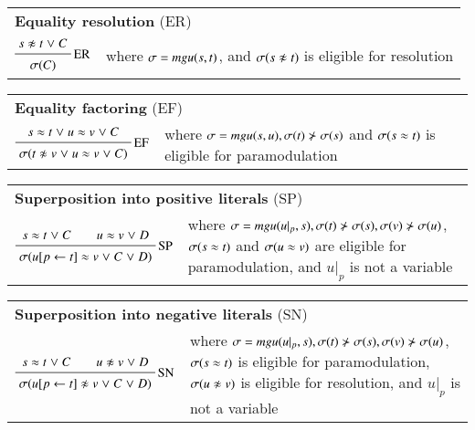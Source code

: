 \medskip
\begin{tabular}{m{}m{}}
    \multicolumn{2}{l}{{\bf Equality resolution} (ER)} \\[\jot]
    $\namedinference{ER}{s \noteq t \llor C}{\sigmacl{C}}$ & where $\sigma = \mathit{mgu}(s,t)$, and $\sigmacl{s \noteq t}$ is eligible for resolution
\end{tabular}

\medskip

\begin{tabular}{m{}m{}}
    \multicolumn{2}{l}{{\bf Equality factoring} (EF)} \\[\jot]
    $\namedinference{EF}{s \eq t \llor u \eq v \llor C}{\sigmacl{t \noteq v \llor u \eq v \llor C}}$ 
        & where $\sigma = \mathit{mgu}(s,u), \sigma(t) \not\succ \sigma(s)$ and 
        $\sigma(s \approx t)$ is eligible for paramodulation
\end{tabular}

\medskip

\begin{tabular}{m{}m{}}
    \multicolumn{2}{l}{{\bf Superposition into positive literals} (SP)} \\[\jot]
    $\namedinference{SP}{s \eq t \llor C \qquad u \eq v \llor D}{\sigmacl{u[p \leftarrow t] \eq v \llor C \llor D}}$ 
        & where $\sigma = \mathit{mgu}(u|_p, s), \sigma(t) \not\succ \sigma(s), \sigma(v) \not\succ \sigma(u)$,
        $\sigma(s \approx t)$ and $\sigma(u \approx v)$ are eligible for paramodulation, and $u|_p$ is not a variable
\end{tabular}

\medskip

\begin{tabular}{m{}m{}}
    \multicolumn{2}{l}{{\bf Superposition into negative literals} (SN)} \\[\jot]
    $\namedinference{SN}{s \eq t \llor C \qquad u \noteq v \llor D}{\sigmacl{u[p \leftarrow t] \noteq v \llor C \llor D}}$ 
        & where $\sigma = \mathit{mgu}(u|_p, s), \sigma(t) \not\succ \sigma(s), \sigma(v) \not\succ \sigma(u)$,
         $\sigma(s \approx t)$ is eligible for paramodulation, $\sigmacl{u \noteq v}$ is eligible for resolution, and $u|_p$ is not a variable
\end{tabular}

